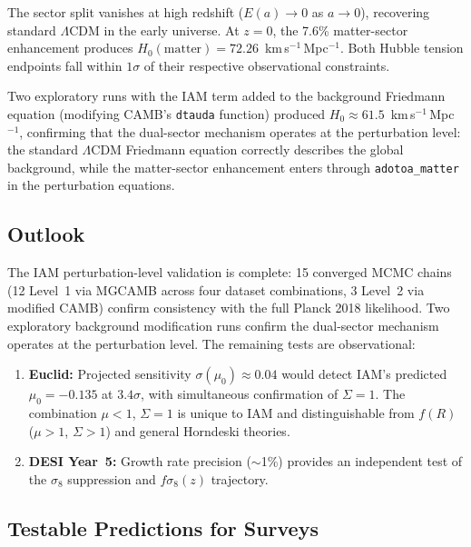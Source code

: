 \documentclass[11pt,letterpaper]{article}
\begin{document}
The sector split vanishes at high redshift ($E(a) \to 0$ as $a \to 0$), recovering standard $\Lambda$CDM in the early universe. At $z = 0$, the 7.6\% matter-sector enhancement produces $H_0(\mathrm{matter}) = 72.26$~km\,s$^{-1}$\,Mpc$^{-1}$. Both Hubble tension endpoints fall within $1\sigma$ of their respective observational constraints.

Two exploratory runs with the IAM term added to the background Friedmann equation (modifying CAMB's \texttt{dtauda} function) produced $H_0 \approx 61.5$~km\,s$^{-1}$\,Mpc$^{-1}$, confirming that the dual-sector mechanism operates at the perturbation level: the standard $\Lambda$CDM Friedmann equation correctly describes the global background, while the matter-sector enhancement enters through \texttt{adotoa\_matter} in the perturbation equations.

\subsection{Outlook}

The IAM perturbation-level validation is complete: 15 converged MCMC chains (12 Level~1 via MGCAMB across four dataset combinations, 3 Level~2 via modified CAMB) confirm consistency with the full Planck 2018 likelihood. Two exploratory background modification runs confirm the dual-sector mechanism operates at the perturbation level. The remaining tests are observational:

\begin{enumerate}
\item \textbf{Euclid:} Projected sensitivity $\sigma(\mu_0) \approx 0.04$ would detect IAM's predicted $\mu_0 = -0.135$ at $3.4\sigma$, with simultaneous confirmation of $\Sigma = 1$. The combination $\mu < 1$, $\Sigma = 1$ is unique to IAM and distinguishable from $f(R)$ ($\mu > 1$, $\Sigma > 1$) and general Horndeski theories.
\item \textbf{DESI Year~5:} Growth rate precision ($\sim$1\%) provides an independent test of the $\sigma_8$ suppression and $f\sigma_8(z)$ trajectory.
\end{enumerate}

\subsection{Testable Predictions for Surveys}
\end{document}
